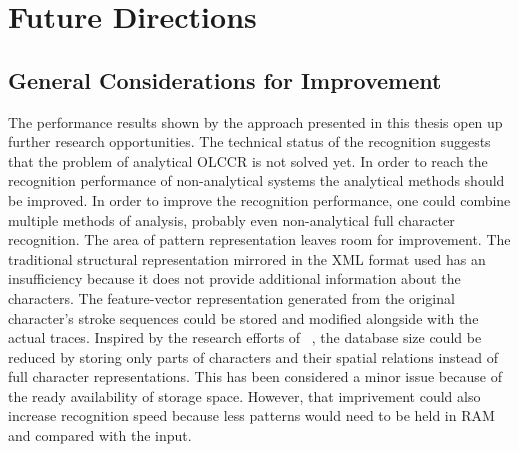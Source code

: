 

\section{Future Directions}
\label{sec:conclusion:futurework}


\subsection{General Considerations for Improvement}
\label{sec:conclusion:generalconsiderationsforimprovement}
The performance results shown by the approach presented in this thesis
open up further research opportunities. The technical status of the recognition
suggests that the problem of analytical OLCCR is not solved yet.
In order to reach the recognition performance of non-analytical systems
the analytical methods should be improved.
In order to improve the recognition performance, one could combine multiple 
methods of analysis, probably even non-analytical full character recognition.
The area of pattern representation leaves room for improvement. 
The traditional structural representation mirrored in the XML format used
has an insufficiency because it does not provide additional information about
the characters. The feature-vector representation generated from the original
character's stroke sequences could be stored and modified alongside with
the actual traces.
Inspired by the research efforts of 
~\citeyear{ChenLee1996}, the database size could be
reduced by storing only parts of characters and their spatial relations
instead of full character representations. This has been considered 
a minor issue because of the ready availability of storage space.
However, that imprivement could also increase recognition speed because
less patterns would need to be held in RAM and compared with the input.


